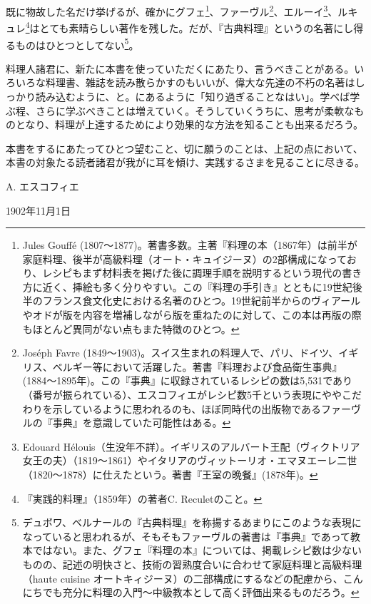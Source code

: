 \begin{main}
既に物故した名だけ挙げるが、確かにグフェ\footnote{Jules Gouffé
  (1807〜1877)。著書多数。主著『料理の本（1867年）は前半が家庭料理、後半が高級料理（オート・キュイジーヌ）の2部構成になっており、レシピもまず材料表を掲げた後に調理手順を説明するという現代の書き方に近く、挿絵も多く分りやすい。この『料理の手引き』とともに19世紀後半のフランス食文化史における名著のひとつ。19世紀前半からのヴィアールやオドが版を内容を増補しながら版を重ねたのに対して、この本は再版の際もほとんど異同がない点もまた特徴のひとつ。}、ファーヴル\footnote{Joséph
  Favre
  (1849〜1903)。スイス生まれの料理人で、パリ、ドイツ、イギリス、ベルギー等において活躍した。著書『料理および食品衛生事典』
  (1884〜1895年)。この『事典』に収録されているレシピの数は5,531であり（番号が振られている）、エスコフィエがレシピ数5千という表現にややこだわりを示しているように思われるのも、ほぼ同時代の出版物であるファーヴルの『事典』を意識していた可能性はある。}、エルーイ\footnote{Edouard
  Hélouis（生没年不詳）。イギリスのアルバート王配（ヴィクトリア女王の夫）（1819〜1861）やイタリアのヴィットーリオ・エマヌエーレ二世（1820〜1878）に仕えたという。著書『王室の晩餐』(1878年)。}、ルキュレ\footnote{『実践的料理』（1859年）の著者C.
  Reculetのこと。}はとても素晴らしい著作を残した。だが、『古典料理』というの名著にし得るものはひとつとしてない\footnote{デュボワ、ベルナールの『古典料理』を称揚するあまりにこのような表現になっていると思われるが、そもそもファーヴルの著書は『事典』であって教本ではない。また、グフェ『料理の本』については、掲載レシピ数は少ないものの、記述の明快さと、技術の習熟度合いに合わせて家庭料理と高級料理（haute
  cuisine
  オートキィジーヌ）の二部構成にするなどの配慮から、こんにちでも充分に料理の入門〜中級教本として高く評価出来るものだろう。}。

料理人諸君に、新たに本書を使っていただくにあたり、言うべきことがある。いろいろな料理書、雑誌を読み散らかすのもいいが、偉大な先達の不朽の名著はしっかり読み込むように、と。にあるように「知り過ぎることなはい」。学べば学ぶ程、さらに学ぶべきことは増えていく。そうしていくうちに、思考が柔軟なものとなり、料理が上達するためにより効果的な方法を知ることも出来るだろう。

本書をするにあたってひとつ望むこと、切に願うのことは、上記の点において、本書の対象たる読者諸君が我がに耳を傾け、実践するさまを見ることに尽きる。
\nopagebreak

\begin{flushright}
A. エスコフィエ \nopagebreak
\end{flushright}

1902年11月1日

\end{main}

